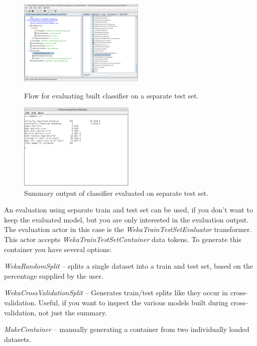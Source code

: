\begin{figure}[ht]
  \begin{minipage}[t]{0.5\linewidth}
    \centering
    \includegraphics[width=6.0cm]{images/basic-testseteval-flow.png}
    \caption{Flow for evaluating built classifier on a separate test set.}
    \label{basic-testseteval-flow}
  \end{minipage}
  \hspace{0.5cm}
  \begin{minipage}[t]{0.5\linewidth}
    \centering
    \includegraphics[width=5.5cm]{images/basic-testseteval-output.png}
    \caption{Summary output of classifier evaluated on separate test set.}
    \label{basic-testseteval-output}
  \end{minipage}
\end{figure}

An evaluation using separate train and test set can be used, if you don't want
to keep the evaluated model, but you are only interested in the evaluation
output. The evaluation actor in this case is the
\textit{WekaTrainTestSetEvaluator} transformer. This actor accepts
\textit{WekaTrainTestSetContainer} data tokens. To generate this container you
have several options:
\begin{tight_itemize}
	\item \textit{WekaRandomSplit} -- splits a single dataset into a train and test
	set, based on the percentage supplied by the user.
	\item \textit{WekaCrossValidationSplit} -- Generates train/test splits like
	they occur in cross-validation. Useful, if you want to inspect the various models
	built during cross-validation, not just the summary.
	\item \textit{MakeContainer} -- manually generating a container from two
	individually loaded datasets.
\end{tight_itemize}

